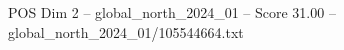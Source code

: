 \begin{textsample}{POS Dim 2 – global\_north\_2024\_01 – Score 31.00 – global\_north\_2024\_01/105544664.txt}
\end{textsample}

